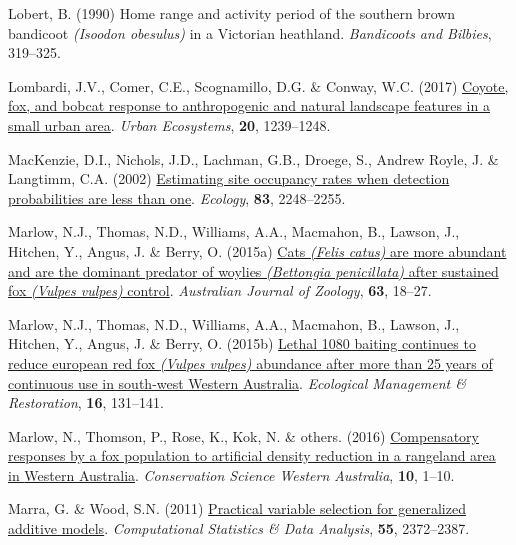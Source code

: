 \documentclass[11pt,a4paper,titlepage,twoside,openright]{style/unimelbthesis}
\newenvironment{CSLReferences}%
  {}%
  {\par}
\begin{document}
\begin{mainmatter}
\begin{CSLReferences}{1}{0}
\leavevmode{}%
Lobert, B. (1990) Home range and activity period of the southern brown bandicoot \emph{({Isoodon obesulus})} in a {V}ictorian heathland. \emph{Bandicoots and Bilbies}, 319--325.

\leavevmode{}%
Lombardi, J.V., Comer, C.E., Scognamillo, D.G. \& Conway, W.C. (2017) \href{https://doi.org/10.1007/s11252-017-0676-z}{Coyote, fox, and bobcat response to anthropogenic and natural landscape features in a small urban area}. \emph{Urban Ecosystems}, \textbf{20}, 1239--1248.

\leavevmode{}%
MacKenzie, D.I., Nichols, J.D., Lachman, G.B., Droege, S., Andrew Royle, J. \& Langtimm, C.A. (2002) \href{https://doi.org/10.1890/0012-9658(2002)083\%5B2248:ESORWD\%5D2.0.CO;2}{Estimating site occupancy rates when detection probabilities are less than one}. \emph{Ecology}, \textbf{83}, 2248--2255.

\leavevmode{}%
Marlow, N.J., Thomas, N.D., Williams, A.A., Macmahon, B., Lawson, J., Hitchen, Y., Angus, J. \& Berry, O. (2015a) \href{https://doi.org/10.1071/ZO14024}{Cats \emph{({Felis catus})} are more abundant and are the dominant predator of woylies \emph{({Bettongia penicillata})} after sustained fox \emph{({Vulpes vulpes})} control}. \emph{{A}ustralian Journal of Zoology}, \textbf{63}, 18--27.

\leavevmode{}%
Marlow, N.J., Thomas, N.D., Williams, A.A., Macmahon, B., Lawson, J., Hitchen, Y., Angus, J. \& Berry, O. (2015b) \href{https://doi.org/10.1111/emr.12162}{Lethal 1080 baiting continues to reduce european red fox \emph{({Vulpes vulpes})} abundance after more than 25 years of continuous use in south-west {W}estern {A}ustralia}. \emph{Ecological Management \& Restoration}, \textbf{16}, 131--141.

\leavevmode{}%
Marlow, N., Thomson, P., Rose, K., Kok, N. \& others. (2016) \href{}{Compensatory responses by a fox population to artificial density reduction in a rangeland area in {Western Australia}}. \emph{Conservation Science Western {A}ustralia}, \textbf{10}, 1--10.

\leavevmode{}%
Marra, G. \& Wood, S.N. (2011) \href{https://doi.org/10.1016/j.csda.2011.02.004}{Practical variable selection for generalized additive models}. \emph{Computational Statistics \& Data Analysis}, \textbf{55}, 2372--2387.


\end{CSLReferences}
\end{mainmatter}
\end{document}

